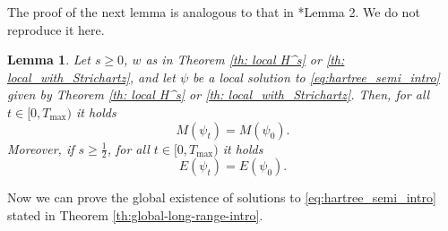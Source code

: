\documentclass[12pt]{article}
\theoremstyle{plain}
\newtheorem{lemma}[theo]{Lemma}
\begin{document}
The proof of the next lemma is analogous to that in \cite{lenzmann_semirel}*{Lemma 2}. We do not reproduce it here.

\begin{lemma}
\label{lemma: en conservation}
Let $s\ge0$, $w$ as in Theorem \ref{th: local H^s} or \ref{th: local_with_Strichartz}, and let $\psi$ be a local solution to \eqref{eq:hartree_semi_intro} given by Theorem \ref{th: local H^s} or \ref{th: local_with_Strichartz}. Then, for all $t \in  [0,T_{\max})$ it holds
\begin{equation*}
    M(\psi_t)= M(\psi_0). 
\end{equation*}
Moreover, if $s\ge\frac12$, for all $t \in  [0,T_{\max})$ it holds
\begin{equation*}
     E(\psi_t)= E(\psi_0). 
\end{equation*}
\end{lemma}


Now we can prove the global existence of solutions to \eqref{eq:hartree_semi_intro} stated in Theorem \ref{th:global-long-range-intro}.
\end{document}
